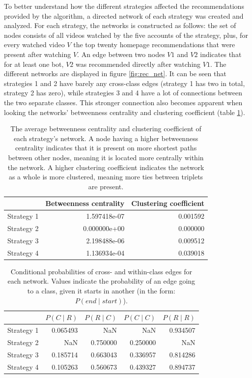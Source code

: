 \documentclass[../main.tex]{subfiles}
\begin{document}
To better understand how the different strategies affected the recommendations provided by the algorithm, a 
directed network of each strategy was created and analyzed. For each strategy, the networks is constructed as 
follows: the set of nodes consists of all videos watched by the five accounts of the strategy, plus, for every 
watched video $V$ the top twenty homepage recommendations that were present after watching $V$. An edge between 
two nodes $V1$ and $V2$ indicates that for at least one bot, $V2$ was recommended directly after watching $V1$. 
The different networks are displayed in figure \ref{fig:rec_net}. It can be seen that strategies
1 and 2 have barely any cross-class edges (strategy 1 has two in total, strategy 2 has zero), while 
strategies 3 and 4 have a lot of connections between the two separate classes. This stronger connection also 
becomes apparent when looking the networks' betweenness centrality and clustering coefficient (table 
\ref{tab:net_metrics}). 

\begin{table}[t]
\centering
\begin{tabular}{lrr}
\toprule
{} &  Betweenness centrality &  Clustering coefficient \\
\midrule
Strategy 1 &            1.597418e-07 &                0.001592 \\
Strategy 2 &            0.000000e+00 &                0.000000 \\
Strategy 3 &            2.198488e-06 &                0.009512 \\
Strategy 4 &            1.136934e-04 &                0.039018 \\
\bottomrule
\end{tabular}
\caption{The average betweenness centrality and clustering coefficient of each strategy's network. A node having a higher betweenness centrality indicates that it is present on more shortest paths between other nodes, meaning it is located more centrally within the network. A higher clustering coefficient indicates the network as a whole is more clustered, meaning more ties between triplets are present.}
\label{tab:net_metrics}
\end{table}

\begin{table}
\centering
\begin{tabular}{lrrrr}
\toprule
{} &    $P(C \mid R)$  & $P(R \mid C)$ &    $P(C \mid C)$ &  $P(R \mid R)$ \\
\midrule
Strategy 1 &  0.065493 &       NaN &       NaN &  0.934507 \\
Strategy 2 &       NaN &  0.750000 &  0.250000 &       NaN \\
Strategy 3 &  0.185714 &  0.663043 &  0.336957 &  0.814286 \\
Strategy 4 &  0.105263 &  0.560673 &  0.439327 &  0.894737 \\
\bottomrule
\end{tabular}
\caption[]{\label{tab:cond-probs} Conditional probabilities of cross- and within-class edges for each network. Values indicate the probability of an edge going to a class, given it starts in another (in the form: $P(end \mid start)$).\footnotemark}
\end{table}
\end{document}
